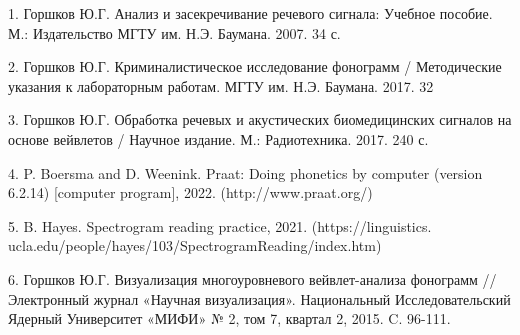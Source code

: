 
    1. Горшков Ю.Г. Анализ и засекречивание речевого сигнала: Учебное пособие. М.: Издательство МГТУ им. Н.Э. Баумана. 2007. 34 с.

    2. Горшков Ю.Г. Криминалистическое исследование фонограмм / Методические указания к лабораторным работам. МГТУ им. Н.Э. Баумана. 2017. 32

    3. Горшков Ю.Г. Обработка речевых и акустических биомедицинских сигналов на основе вейвлетов / Научное издание. М.: Радиотехника. 2017. 240 с.

    4. P. Boersma and D. Weenink. Praat: Doing phonetics by computer (version 6.2.14) [computer program], 2022. (http://www.praat.org/)

    5. B. Hayes. Spectrogram reading practice, 2021. (https://linguistics. ucla.edu/people/hayes/103/SpectrogramReading/index.htm)

    6. Горшков Ю.Г. Визуализация многоуровневого вейвлет-анализа фонограмм //   Электронный журнал «Научная визуализация». Национальный Исследовательский   Ядерный Университет «МИФИ» № 2, том 7, квартал 2, 2015. C. 96-111.
